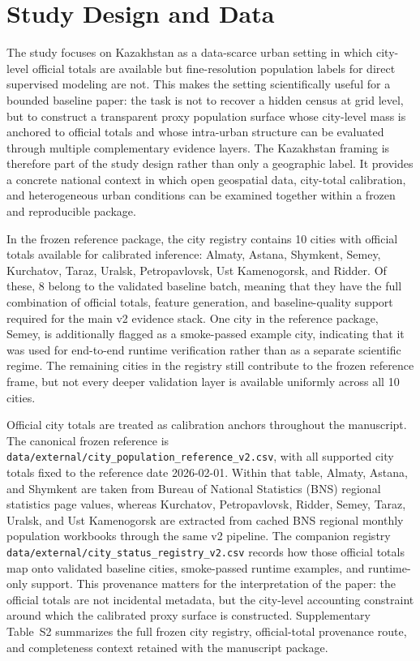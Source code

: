 \section{Study Design and Data}

The study focuses on Kazakhstan as a data-scarce urban setting in which city-level official totals are available but fine-resolution population labels for direct supervised modeling are not. This makes the setting scientifically useful for a bounded baseline paper: the task is not to recover a hidden census at grid level, but to construct a transparent proxy population surface whose city-level mass is anchored to official totals and whose intra-urban structure can be evaluated through multiple complementary evidence layers. The Kazakhstan framing is therefore part of the study design rather than only a geographic label. It provides a concrete national context in which open geospatial data, city-total calibration, and heterogeneous urban conditions can be examined together within a frozen and reproducible package.

In the frozen reference package, the city registry contains 10 cities with official totals available for calibrated inference: Almaty, Astana, Shymkent, Semey, Kurchatov, Taraz, Uralsk, Petropavlovsk, Ust Kamenogorsk, and Ridder. Of these, 8 belong to the validated baseline batch, meaning that they have the full combination of official totals, feature generation, and baseline-quality support required for the main v2 evidence stack. One city in the reference package, Semey, is additionally flagged as a smoke-passed example city, indicating that it was used for end-to-end runtime verification rather than as a separate scientific regime. The remaining cities in the registry still contribute to the frozen reference frame, but not every deeper validation layer is available uniformly across all 10 cities.

Official city totals are treated as calibration anchors throughout the manuscript. The canonical frozen reference is \texttt{data/external/city\_population\_reference\_v2.csv}, with all supported city totals fixed to the reference date 2026-02-01. Within that table, Almaty, Astana, and Shymkent are taken from Bureau of National Statistics (BNS) regional statistics page values, whereas Kurchatov, Petropavlovsk, Ridder, Semey, Taraz, Uralsk, and Ust Kamenogorsk are extracted from cached BNS regional monthly population workbooks through the same v2 pipeline. The companion registry \texttt{data/external/city\_status\_registry\_v2.csv} records how those official totals map onto validated baseline cities, smoke-passed runtime examples, and runtime-only support. This provenance matters for the interpretation of the paper: the official totals are not incidental metadata, but the city-level accounting constraint around which the calibrated proxy surface is constructed. Supplementary Table~S2 summarizes the full frozen city registry, official-total provenance route, and completeness context retained with the manuscript package.

